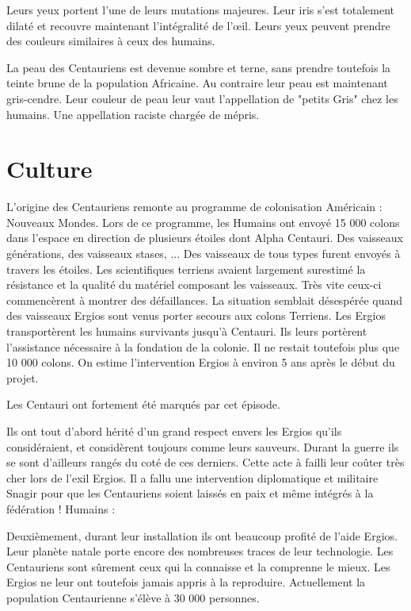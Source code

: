 \begin{multicols}{2}
Leurs yeux portent l'une de leurs mutations majeures. Leur iris s'est totalement dilaté et recouvre maintenant l'intégralité de l'œil. Leurs yeux peuvent prendre des couleurs similaires à ceux des humains.

La peau des Centauriens est devenue sombre et terne, sans prendre toutefois la teinte brune de la population Africaine. Au contraire leur peau est maintenant gris-cendre. Leur couleur de peau leur vaut l'appellation de "petits Gris" chez les humains. Une appellation raciste chargée de mépris. 

\section{Culture}

L'origine des Centauriens remonte au programme de colonisation Américain : Nouveaux Mondes. Lors de ce programme, les Humains ont envoyé 15 000 colons dans l'espace en direction de plusieurs étoiles dont Alpha Centauri. Des vaisseaux générations, des vaisseaux stases, ... Des vaisseaux de tous types furent envoyés à travers les étoiles. Les scientifiques terriens avaient largement surestimé la résistance et la qualité du matériel composant les vaisseaux. Très vite ceux-ci commencèrent à montrer des défaillances. La situation semblait désespérée quand des vaisseaux Ergios sont venus porter secours aux colons Terriens. Les Ergios transportèrent les humains survivants jusqu'à Centauri. Ils leurs portèrent l'assistance nécessaire à la fondation de la colonie. Il ne restait toutefois plus que 10 000 colons. On estime l'intervention Ergios à environ 5 ans après le début du projet. 

Les Centauri ont fortement été marqués par cet épisode.

Ils ont tout d'abord hérité d'un grand respect envers les Ergios qu'ils considéraient, et considèrent toujours comme leurs sauveurs. Durant la guerre ils se sont d'ailleurs rangés du coté de ces derniers. Cette acte à failli leur coûter très cher lors de l'exil Ergios. Il a fallu une intervention diplomatique et militaire Snagir pour que les Centauriens soient laissés en paix et même intégrés à la fédération ! Humains :

Deuxièmement, durant leur installation ils ont beaucoup profité de l'aide Ergios. Leur planète natale porte encore des nombreuses traces de leur technologie. Les Centauriens sont sûrement ceux qui la connaisse et la comprenne le mieux. Les Ergios ne leur ont toutefois jamais appris à la reproduire. Actuellement la population Centaurienne s'élève à 30 000 personnes.


\end{multicols}
